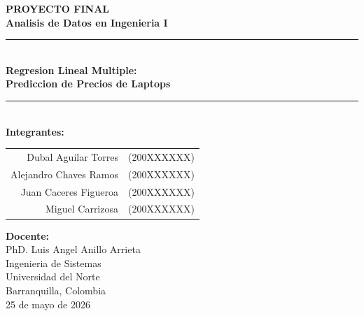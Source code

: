 \documentclass[12pt,a4paper]{article}
\begin{document}
\begin{titlepage}
    
    \vspace*{4cm}
    
    \begin{center}
        {\Huge\bfseries\textcolor{azuloscuro}{PROYECTO FINAL}}\\[0.5cm]
        {\LARGE\bfseries\textcolor{azulclaro}{Analisis de Datos en Ingenieria I}}\\[1cm]
        
        \rule{0.8\textwidth}{1.5pt}\\[0.8cm]
        
        {\Large\textbf{Regresion Lineal Multiple:}}\\[0.3cm]
        {\Large\textbf{Prediccion de Precios de Laptops}}\\[1.5cm]
        
        \rule{0.6\textwidth}{0.5pt}\\[1cm]
        
        {\large\textbf{Integrantes:}}\\[0.5cm]
        \begin{tabular}{rl}
            Dubal Aguilar Torres & (200XXXXXX) \\
            Alejandro Chaves Ramos & (200XXXXXX) \\
            Juan Caceres Figueroa & (200XXXXXX) \\
            Miguel Carrizosa & (200XXXXXX) \\
        \end{tabular}
        
        \vfill
        
        {\large\textbf{Docente:}}\\[0.3cm]
        PhD. Luis Angel Anillo Arrieta\\[1cm]
        
        {\large Ingenieria de Sistemas}\\[0.3cm]
        {\large Universidad del Norte}\\[0.3cm]
        {\large Barranquilla, Colombia}\\[0.5cm]
        {\large 25 de mayo de 2026}
        
    \end{center}
\end{titlepage}
\end{document}

